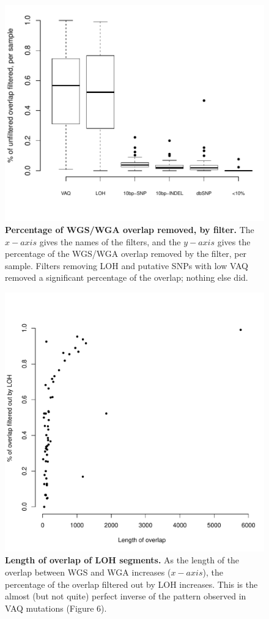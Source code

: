 \documentclass[11pt]{article} %
\begin{document}
\begin{figure}
\centerline{
\includegraphics[width=6in]{boxplot_percent_overlap_filtered.pdf} }
\caption{\textbf{Percentage of WGS/WGA overlap removed, by filter.} The $x-axis$ gives the names of the filters, and the $y-axis$ gives the percentage of the WGS/WGA overlap removed by the filter, per sample. Filters removing LOH and putative SNPs with low VAQ removed a significant percentage of the overlap; nothing else did.}
\end{figure}

\begin{figure}
\centerline{
\includegraphics[width=5in]{./LOH_VAQ/LOH_all.pdf} }
\caption{\textbf{Length of overlap of LOH segments.} As the length of the overlap between WGS and WGA increases ($x-axis$), the percentage of the overlap filtered out by LOH increases. This is the almost (but not quite) perfect inverse of the pattern observed in VAQ mutations (Figure 6).}
\end{figure}
\end{document}
